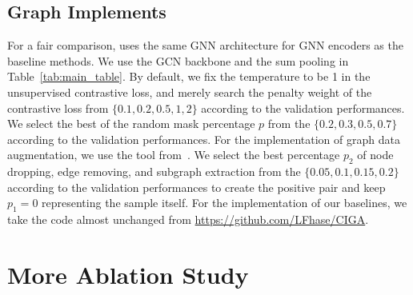 \subsection{Graph Implements}
For a fair comparison, \ours uses the same GNN architecture for GNN encoders as the baseline methods. We use the GCN backbone and the sum pooling in Table~\ref{tab:main_table}.
By default, we fix the temperature to be 1 in the unsupervised contrastive loss, and merely search the penalty weight of the contrastive loss from $\{0.1, 0.2, 0.5, 1, 2\}$ according to the validation performances. 
We select the best of the random mask percentage $p$ from the $\{0.2,0.3,0.5,0.7\}$ according to the validation performances.
For the implementation of graph data augmentation, we use the tool from~\cite{graphCL}. 
We select the best percentage $p_2$ of node dropping, edge removing, and subgraph extraction from the $\{0.05, 0.1, 0.15, 0.2\}$ according to the validation performances to create the positive pair and keep $p_1=0$ representing the sample itself. 
For the implementation of our baselines, we take the code almost unchanged from
\url{https://github.com/LFhase/CIGA}.
\section{More Ablation Study}

